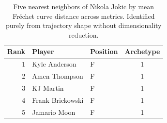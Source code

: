 \begin{table}[htbp]
  \centering\small
  \begin{tabular}{rllc}
    \toprule
    Rank & Player & Position & Archetype \\
    \midrule
    1 & Kyle Anderson & F & 1 \\
    2 & Amen Thompson & F & 1 \\
    3 & KJ Martin & F & 1 \\
    4 & Frank Brickowski & F & 1 \\
    5 & Jamario Moon & F & 1 \\
    \bottomrule
  \end{tabular}
  \caption{Five nearest neighbors of Nikola Jokic by mean Fr\'{e}chet curve distance across metrics. Identified purely from trajectory shape without dimensionality reduction.}
  \label{tab:Nikola_Jokic_frechet_curve_neighbors}
\end{table}

